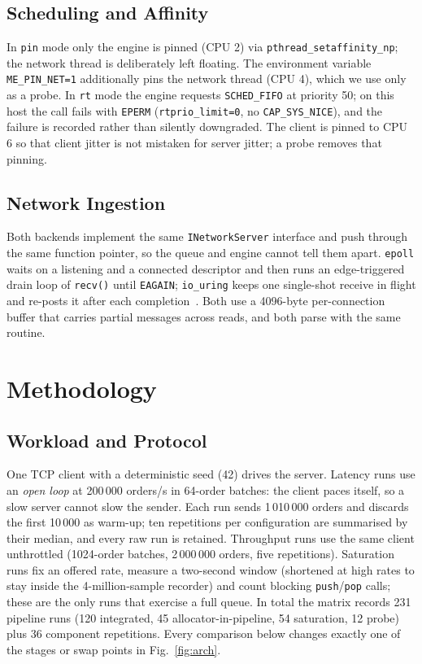 \documentclass[conference]{IEEEtran}
\begin{document}
\subsection{Scheduling and Affinity}
In \texttt{pin} mode only the engine is pinned (CPU 2) via
\texttt{pthread\_setaffinity\_np}; the network thread is deliberately left
floating. The environment variable \texttt{ME\_PIN\_NET=1} additionally pins the
network thread (CPU 4), which we use only as a probe. In \texttt{rt} mode the
engine requests \texttt{SCHED\_FIFO} at priority 50; on this host the call fails
with \texttt{EPERM} (\texttt{rtprio\_limit=0}, no \texttt{CAP\_SYS\_NICE}), and
the failure is recorded rather than silently downgraded. The client is pinned to
CPU 6 so that client jitter is not mistaken for server jitter; a probe removes
that pinning.

\subsection{Network Ingestion}
Both backends implement the same \texttt{INetworkServer} interface and push
through the same function pointer, so the queue and engine cannot tell them
apart. \texttt{epoll} waits on a listening and a connected descriptor and then
runs an edge-triggered drain loop of \texttt{recv()} until \texttt{EAGAIN};
\texttt{io\_uring} keeps one single-shot receive in flight and re-posts it after
each completion~\cite{axboe}. Both use a 4096-byte per-connection buffer that
carries partial messages across reads, and both parse with the same routine.

\section{Methodology}
\label{sec:method}

\subsection{Workload and Protocol}
One TCP client with a deterministic seed (42) drives the server. Latency runs
use an \emph{open loop} at 200\,000 orders/s in 64-order batches: the client
paces itself, so a slow server cannot slow the sender. Each run sends
1\,010\,000 orders and discards the first 10\,000 as warm-up; ten repetitions per
configuration are summarised by their median, and every raw run is retained.
Throughput runs use the same client unthrottled (1024-order batches,
2\,000\,000 orders, five repetitions). Saturation runs fix an offered rate,
measure a two-second window (shortened at high rates to stay inside the
4-million-sample recorder) and count blocking \texttt{push}/\texttt{pop} calls;
these are the only runs that exercise a full queue. In total the matrix records
231 pipeline runs (120 integrated, 45 allocator-in-pipeline, 54 saturation,
12 probe) plus 36 component repetitions. Every comparison below changes exactly
one of the stages or swap points in Fig.~\ref{fig:arch}.
\end{document}
